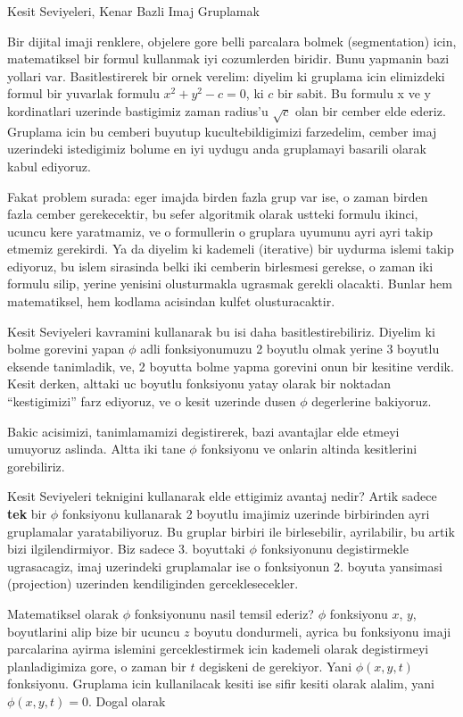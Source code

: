 \documentclass[12pt,fleqn]{article}\usepackage{../common}
\begin{document}
Kesit Seviyeleri, Kenar Bazli Imaj Gruplamak

Bir dijital imaji renklere, objelere gore belli parcalara bolmek
(segmentation) icin, matematiksel bir formul kullanmak iyi cozumlerden
biridir. Bunu yapmanin bazi yollari var. Basitlestirerek bir ornek
verelim: diyelim ki gruplama icin elimizdeki formul bir yuvarlak
formulu $x^2+y^2 - c = 0$, ki $c$ bir sabit. Bu formulu x ve y
kordinatlari uzerinde bastigimiz zaman radius'u $\sqrt{c}$ olan bir
cember elde ederiz. Gruplama icin bu cemberi buyutup
kucultebildigimizi farzedelim, cember imaj uzerindeki istedigimiz
bolume en iyi uydugu anda gruplamayi basarili olarak kabul ediyoruz.

Fakat problem surada: eger imajda birden fazla grup var ise, o zaman
birden fazla cember gerekecektir, bu sefer algoritmik olarak ustteki
formulu ikinci, ucuncu kere yaratmamiz, ve o formullerin o gruplara
uyumunu ayri ayri takip etmemiz gerekirdi. Ya da diyelim ki kademeli
(iterative) bir uydurma islemi takip ediyoruz, bu islem sirasinda
belki iki cemberin birlesmesi gerekse, o zaman iki formulu silip,
yerine yenisini olusturmakla ugrasmak gerekli olacakti. Bunlar hem
matematiksel, hem kodlama acisindan kulfet olusturacaktir.

Kesit Seviyeleri kavramini kullanarak bu isi daha
basitlestirebiliriz. Diyelim ki bolme gorevini yapan $\phi$ adli
fonksiyonumuzu 2 boyutlu olmak yerine 3 boyutlu eksende tanimladik,
ve, 2 boyutta bolme yapma gorevini onun bir kesitine verdik. Kesit
derken, alttaki uc boyutlu fonksiyonu yatay olarak bir noktadan
``kestigimizi'' farz ediyoruz, ve o kesit uzerinde dusen $\phi$
degerlerine bakiyoruz.

Bakic acisimizi, tanimlamamizi degistirerek, bazi avantajlar elde
etmeyi umuyoruz aslinda. Altta iki tane $\phi$ fonksiyonu ve onlarin
altinda kesitlerini gorebiliriz.


Kesit Seviyeleri teknigini kullanarak elde ettigimiz avantaj nedir?
Artik sadece \textbf{tek} bir $\phi$ fonksiyonu kullanarak 2 boyutlu
imajimiz uzerinde birbirinden ayri gruplamalar yaratabiliyoruz. Bu
gruplar birbiri ile birlesebilir, ayrilabilir, bu artik bizi
ilgilendirmiyor. Biz sadece 3. boyuttaki $\phi$ fonksiyonunu
degistirmekle ugrasacagiz, imaj uzerindeki gruplamalar ise o
fonksiyonun 2. boyuta yansimasi (projection) uzerinden kendiliginden
gerceklesecekler.

Matematiksel olarak $\phi$ fonksiyonunu nasil temsil ederiz? $\phi$
fonksiyonu $x$, $y$, boyutlarini alip bize bir ucuncu $z$ boyutu
dondurmeli, ayrica bu fonksiyonu imaji parcalarina ayirma islemini
gerceklestirmek icin kademeli olarak degistirmeyi planladigimiza gore,
o zaman bir $t$ degiskeni de gerekiyor. Yani $\phi(x,y,t)$
fonksiyonu. Gruplama icin kullanilacak kesiti ise sifir kesiti olarak
alalim, yani $\phi(x,y,t) = 0$. Dogal olarak
\end{document}
